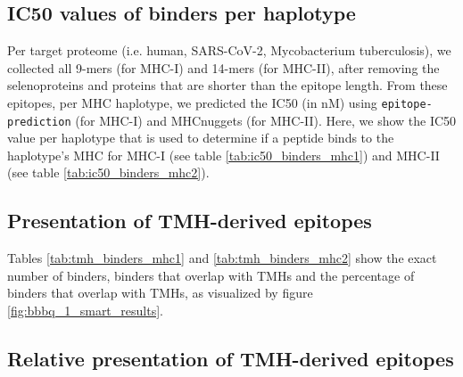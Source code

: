 \subsection{IC50 values of binders per haplotype}
\label{subsec:ic50s_per_haplotype}

Per target proteome (i.e. human, SARS-CoV-2, Mycobacterium tuberculosis),
we collected all 9-mers (for MHC-I) and 14-mers (for MHC-II),
after removing the selenoproteins and proteins that are shorter
than the epitope length.
From these epitopes, per MHC haplotype,
we predicted the IC50 (in nM) using \verb;epitope-prediction; (for MHC-I)
and MHCnuggets (for MHC-II). 
Here, we show the IC50 value per haplotype that
is used to determine if a peptide binds to the haplotype's MHC
for MHC-I (see table \ref{tab:ic50_binders_mhc1}) and 
MHC-II (see table \ref{tab:ic50_binders_mhc2}).





\subsection{Presentation of TMH-derived epitopes}

Tables \ref{tab:tmh_binders_mhc1} and \ref{tab:tmh_binders_mhc2}
show the exact number of binders, binders that overlap with TMHs
and the percentage of binders that overlap with TMHs, as
visualized by figure \ref{fig:bbbq_1_smart_results}.





\subsection{Relative presentation of TMH-derived epitopes}

